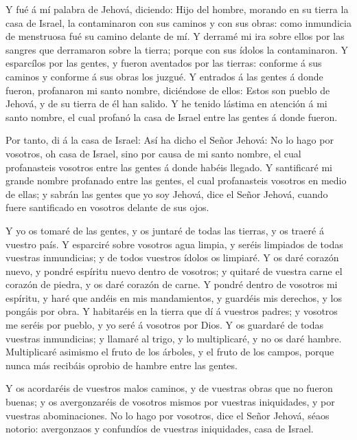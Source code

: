  Y fué á mí palabra de Jehová, diciendo:  Hijo
del hombre, morando en su tierra la casa de Israel, la contaminaron con
sus caminos y con sus obras: como inmundicia de menstruosa fué su camino
delante de mí.  Y derramé mi ira sobre ellos por las
sangres que derramaron sobre la tierra; porque con sus ídolos la
contaminaron.  Y esparcílos por las gentes, y fueron
aventados por las tierras: conforme á sus caminos y conforme á sus obras
los juzgué.  Y entrados á las gentes á donde fueron,
profanaron mi santo nombre, diciéndose de ellos: Estos son pueblo de
Jehová, y de su tierra de él han salido.  Y he tenido
lástima en atención á mi santo nombre, el cual profanó la casa de Israel
entre las gentes á donde fueron.

 Por tanto, di á la casa de Israel: Así ha dicho el Señor
Jehová: No lo hago por vosotros, oh casa de Israel, sino por causa de mi
santo nombre, el cual profanasteis vosotros entre las gentes á donde
habéis llegado.  Y santificaré mi grande nombre profanado
entre las gentes, el cual profanasteis vosotros en medio de ellas; y
sabrán las gentes que yo soy Jehová, dice el Señor Jehová, cuando fuere
santificado en vosotros delante de sus ojos.

 Y yo os tomaré de las gentes, y os juntaré de todas las
tierras, y os traeré á vuestro país.  Y esparciré sobre
vosotros agua limpia, y seréis limpiados de todas vuestras inmundicias;
y de todos vuestros ídolos os limpiaré.  Y os daré corazón
nuevo, y pondré espíritu nuevo dentro de vosotros; y quitaré de vuestra
carne el corazón de piedra, y os daré corazón de carne.  Y
pondré dentro de vosotros mi espíritu, y haré que andéis en mis
mandamientos, y guardéis mis derechos, y los pongáis por obra.
 Y habitaréis en la tierra que dí á vuestros padres; y
vosotros me seréis por pueblo, y yo seré á vosotros por Dios.
 Y os guardaré de todas vuestras inmundicias; y llamaré al
trigo, y lo multiplicaré, y no os daré hambre. 
Multiplicaré asimismo el fruto de los árboles, y el fruto de los campos,
porque nunca más recibáis oprobio de hambre entre las gentes.

 Y os acordaréis de vuestros malos caminos, y de vuestras
obras que no fueron buenas; y os avergonzaréis de vosotros mismos por
vuestras iniquidades, y por vuestras abominaciones.  No lo
hago por vosotros, dice el Señor Jehová, séaos notorio: avergonzaos y
confundíos de vuestras iniquidades, casa de Israel.

